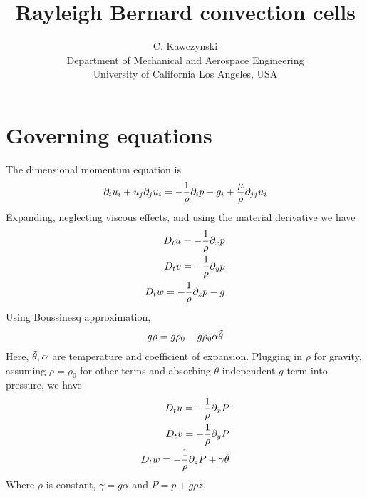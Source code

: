 \documentclass[11pt]{article}
\begin{document}
\doublespacing
\title{Rayleigh Bernard convection cells}
\author{C. Kawczynski \\
Department of Mechanical and Aerospace Engineering \\
University of California Los Angeles, USA\\
}
\maketitle

\section{Governing equations}
The dimensional momentum equation is
\begin{equation}\begin{aligned}
\partial_t u_i+u_j\partial_j u_i = -\frac{1}{\rho} \partial_i p - g_i + \frac{\mu}{\rho} \partial_{jj} u_i \\
\end{aligned} \end{equation}
Expanding, neglecting viscous effects, and using the material derivative we have
\begin{equation}\begin{aligned}
D_t u = -\frac{1}{\rho} \partial_x p     \\
D_t v = -\frac{1}{\rho} \partial_y p     \\
D_t w = -\frac{1}{\rho} \partial_z p - g \\
\end{aligned} \end{equation}
Using Boussinesq approximation,
\begin{equation}\begin{aligned}
g \rho = g \rho_0 - g \rho_0 \alpha \tilde{\theta}
\end{aligned} \end{equation}
Here, $\tilde{\theta}, \alpha$ are temperature and coefficient of expansion.
Plugging in $\rho$ for gravity, assuming $\rho=\rho_0$ for other terms and absorbing $\theta$ independent $g$ term into pressure, we have
\begin{equation}\begin{aligned}
D_t u = -\frac{1}{\rho} \partial_x P     \\
D_t v = -\frac{1}{\rho} \partial_y P     \\
D_t w = -\frac{1}{\rho} \partial_z P + \gamma \tilde{\theta} \\
\end{aligned} \end{equation}
Where $\rho$ is constant, $\gamma=g\alpha$ and $P=p + g\rho z$.
\end{document}
